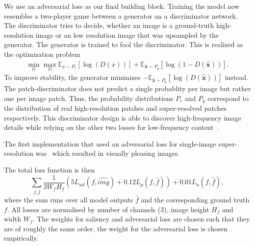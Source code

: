\documentclass{scrartcl}
\newcommand{\img}{f} %
\begin{document}
We use an adversarial loss as our final building block.
Training the model now resembles a two-player game between a generator an a discriminator network.
The discriminator tries to decide, whether an image is a ground-truth high-resolution image or an low resolution image that was upsampled by the generator.
The generator is trained to fool the discriminator.
This is realized as the optimization problem~\cite{GAN}
\begin{align}
 \min_G \max_D \mathbb{E}_{x \sim P_r} \left[ \log (D({x})) \right] +
  \mathbb{E}_{\hat{\bm{x}} \sim P_g} \left[  \log (1 - D(\hat{\bm{x}})) \right].
\end{align}
To improve stability, the generator minimizes
\( - \mathbb{E}_{\hat{\bm{x}} \sim P_g} \left[ \log (D(\hat{\bm{x}})) \right]\)
instead.
The patch-discriminator does not predict a single probablity per image but rather one per image patch.
Thus, the probability distributions $P_r$ and $P_g$ correspond to the distribution of real high-resolution patches and super-resolved patches respectively.
This discriminator design is able to discover high-frequency image details while relying on the other two losses for low-frequency content~\cite{PatchGAN}.

The first implementation that used an adversarial loss for single-image super-resolution was~\cite{SRGAN} which resulted in visually pleasing images.

The total loss function is then
\begin{equation}
  \label{eq:total-loss}
\sum_{\img, \hat{\img}}
\frac{1}{3 W_{\img} H_{\img}}
  \left( 5 L_{\text{sal}} (\img, \hat{img}) + 0.12  L_p(\img, \hat{\img}) \right) + 0.01 L_a(\img, \hat{\img}),
\end{equation}
where the sum runs over all model outputs \(\hat{\img}\) and the corresponding ground truth \(\img\).
All losses are normalised by number of channels (3), image height \(H_{\img}\) and width \(W_{\img}\).
The weights for saliency and adversarial loss are chosen such that they are of roughly the same order, the weight for the adversarial loss is chosen empirically.
\end{document}
